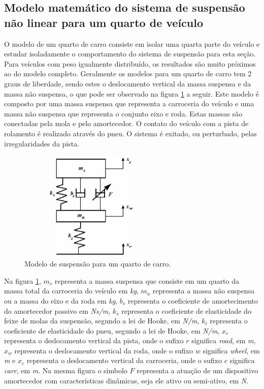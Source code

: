 \subsection{Modelo matemático do sistema de suspensão não linear para um quarto de veículo }
O modelo de um quarto de carro consiste em isolar uma quarta parte do veículo e estudar isoladamente o comportamento do sistema de suspensão para esta seção. Para veículos com peso igualmente distribuído, os resultados são muito próximos ao do modelo completo. Geralmente os modelos para um quarto de carro tem 2 graus de liberdade, sendo estes o deslocamento vertical da massa suspensa e da massa não suspensa, o que pode ser observado na figura \ref{fig:massa_mola_nao_linear_controlavel} a seguir. Este modelo é composto por uma massa suspensa que representa a carroceria do veículo e uma massa não suspensa que representa o conjunto eixo e roda. Estas massas são conectadas pela mola e pelo amortecedor. O contato do veículo com a pista de rolamento é realizado através do pneu. O sistema é exitado, ou perturbado, pelas irregularidades da pista.
\FloatBarrier
\begin{figure}[htbp]
  \begin{centering}
    \includegraphics[width=7cm,height=5.25cm]{img/massa_mola_nao_linear_controlavel.png}
    \caption{Modelo de suspensão para um quarto de carro.} 
    \label{fig:massa_mola_nao_linear_controlavel}
  \end{centering}
\end{figure}
\FloatBarrier
Na figura \ref{fig:massa_mola_nao_linear_controlavel}, $m_s$ representa a massa suspensa que consiste em um quarto da massa total da carroceria do veículo em \emph{kg}, $m_u$ representa a massa não suspensa ou a massa do eixo e da roda em \emph{kg}, $b_s$ representa o coeficiente de amortecimento do amortecedor passivo em \emph{Ns/m}, $k_s$ representa o coeficiente de elasticidade do feixe de molas da suspensão, segundo a lei de Hooke, em \emph{N/m}, $k_t$ representa o coeficiente de elasticidade do pneu, segundo a lei de Hooke, em \emph{N/m}, $x_r$ representa o deslocamento vertical da pista, onde o sufixo $r$ significa \emph{road}, em \emph{m}, $x_w$ representa o deslocamento vertical da roda, onde o sufixo $w$ significa \emph{wheel}, em \emph{m} e $x_c$ representa o deslocamento vertical da carroceria, onde o sufixo $c$ significa \emph{carr}, em \emph{m}. Na mesma figura o simbolo $F$ representa a atuação de um dispositivo amortecedor com características dinâmicas, seja ele ativo ou semi-ativo, em \emph{N}.
  
